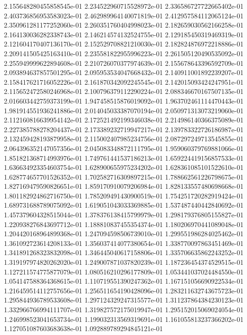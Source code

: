 2.155648280455858545e-01
2.234522960715528972e-01
2.336586727722665402e-01
2.403736856953583023e-01
2.462989964140071819e-01
2.412957584112065124e-01
2.350961281177252060e-01
2.260351760404998023e-01
2.182659030562166258e-01
2.164130036282338743e-01
2.146214574132524755e-01
2.129185450319469319e-01
2.121604170407136170e-01
2.152529708821210030e-01
2.182824876972218886e-01
2.209141505425163410e-01
2.235581822955996223e-01
2.261505120490535092e-01
2.255949999622894608e-01
2.210726070377974639e-01
2.155678643396592709e-01
2.093894637857501295e-01
2.095953534047668432e-01
2.140911001892239207e-01
2.158417621716052226e-01
2.161870342092245545e-01
2.142015093424247951e-01
2.115652472580246968e-01
2.100796379112290224e-01
2.088346670167507135e-01
2.016603442759373199e-01
1.947458515876019092e-01
1.963702461114470443e-01
1.981914551936241886e-01
2.014045033387070194e-01
2.050971313073219060e-01
2.112160816639954142e-01
2.172521492199346038e-01
2.214986140366375089e-01
2.227385788278204437e-01
2.173389232719947217e-01
2.139783322726186987e-01
2.132459428193879958e-01
2.115002407985234756e-01
2.087297249713545855e-01
2.064396352147057356e-01
2.045083348872111795e-01
1.959060379769881066e-01
1.851821368714993976e-01
1.749761441537186213e-01
1.659224419156857533e-01
1.636634923354603754e-01
1.628900655975234202e-01
1.628361085101522610e-01
1.628774657701526352e-01
1.702582716309897215e-01
1.788662561226798675e-01
1.827169479590826651e-01
1.859170910079206984e-01
1.828133557480698668e-01
1.801182924862716750e-01
1.785209491430900519e-01
1.754251720282919424e-01
1.689731688789075092e-01
1.619051043033369885e-01
1.537487440442840692e-01
1.457379604328515044e-01
1.378376138415799979e-01
1.298179376805155827e-01
1.220938276843697712e-01
1.188810837455354374e-01
1.180206970441089048e-01
1.204420168964899368e-01
1.247094598506739010e-01
1.299551986284025462e-01
1.361092723614208133e-01
1.356037414077380654e-01
1.338770097863451469e-01
1.341891268323832098e-01
1.346445040617158806e-01
1.335706635862243252e-01
1.319197974820262020e-01
1.249007871037820239e-01
1.187236454374529515e-01
1.127211574775877079e-01
1.080516210296177809e-01
1.053441037024484550e-01
1.054147588364368615e-01
1.110719551390247362e-01
1.167151056690922534e-01
1.216459514112757656e-01
1.256511654190428096e-01
1.283211632743675723e-01
1.295844936789533608e-01
1.297124329247315577e-01
1.311237864384230123e-01
1.332966766994111707e-01
1.319827572175019947e-01
1.295152015069024054e-01
1.246998523041653734e-01
1.199032313569319691e-01
1.161055813237366202e-01
1.127051087603683638e-01
1.092889789294845121e-01
